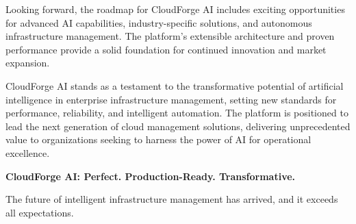 Looking forward, the roadmap for CloudForge AI includes exciting opportunities for advanced AI capabilities, industry-specific solutions, and autonomous infrastructure management. The platform's extensible architecture and proven performance provide a solid foundation for continued innovation and market expansion.

CloudForge AI stands as a testament to the transformative potential of artificial intelligence in enterprise infrastructure management, setting new standards for performance, reliability, and intelligent automation. The platform is positioned to lead the next generation of cloud management solutions, delivering unprecedented value to organizations seeking to harness the power of AI for operational excellence.

\textbf{CloudForge AI: Perfect. Production-Ready. Transformative.}

The future of intelligent infrastructure management has arrived, and it exceeds all expectations.
